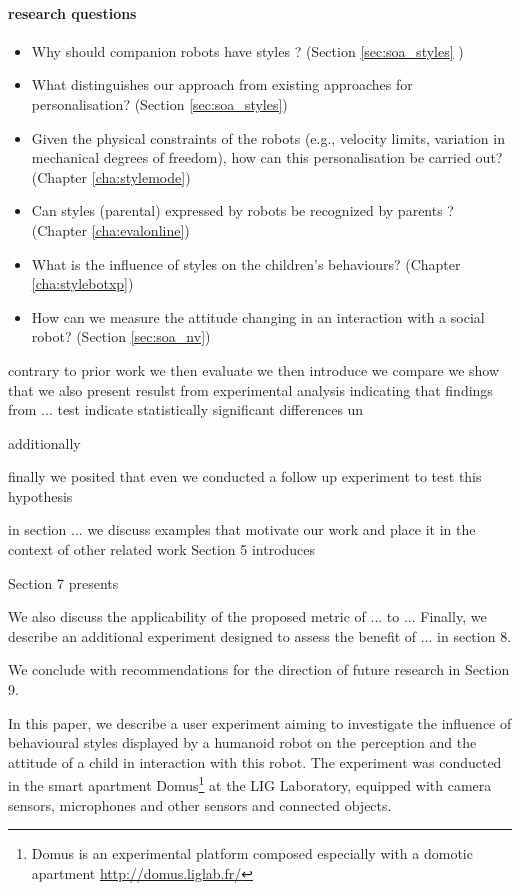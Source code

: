 \documentclass[smallextended]{svjour3}
\begin{document}
\paragraph{research questions}
\begin{itemize}[noitemsep,nolistsep]
	\item Why should companion robots have styles ? (Section \ref{sec:soa_styles} )
	\item What distinguishes our approach from existing approaches for personalisation? (Section \ref{sec:soa_styles})
	\item Given the physical constraints of the robots (e.g., velocity limits, variation in mechanical degrees of freedom), how can this personalisation be carried out?(Chapter \ref{cha:stylemode})
	\item Can styles (parental) expressed by robots be recognized by parents ? (Chapter \ref{cha:evalonline})
	\item What is the influence of styles on the children's behaviours? (Chapter \ref{cha:stylebotxp})
	\item How can we measure the attitude changing in an interaction with a social robot? (Section \ref{sec:soa_nv})
	\end{itemize}


contrary to prior work
we then evaluate
we then introduce
we compare
we show that
we also present resulst from experimental analysis indicating that 
findings from ... test indicate  statistically significant differences un 

additionally

finally we posited that even 
we conducted a follow up experiment to test this hypothesis

in section ... we discuss examples that motivate our work and place it in the context of other related work
Section 5 introduces

Section 7 presents 

We also discuss the applicability of the proposed metric of ... to ...
Finally, we describe an additional experiment designed to assess the benefit of ... in section 8.

We conclude with recommendations for the direction of future research in Section 9.

In this paper, we describe a user experiment aiming to investigate the influence of behavioural styles displayed by a humanoid robot on the perception and the attitude of a child in interaction with this robot. 
The experiment was conducted in the smart apartment Domus\footnote{Domus is an experimental platform composed especially with a domotic apartment \url{http://domus.liglab.fr/}} at the LIG Laboratory, equipped with camera sensors, microphones and other sensors and connected objects. 
\end{document}
